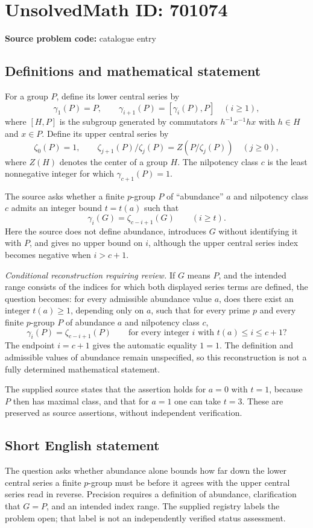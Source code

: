 \documentclass[11pt]{article}
\begin{document}
\section*{UnsolvedMath ID: 701074}
\textbf{Source problem code:} catalogue entry
\subsection{Definitions and mathematical statement}
For a group \(P\), define its lower central series by
\[
\gamma_1(P)=P,\qquad \gamma_{i+1}(P)=[\gamma_i(P),P]\quad(i\geq1),
\]
where \([H,P]\) is the subgroup generated by commutators \(h^{-1}x^{-1}hx\) with \(h\in H\) and \(x\in P\). Define its upper central series by
\[
\zeta_0(P)=1,\qquad
\zeta_{j+1}(P)/\zeta_j(P)=Z(P/\zeta_j(P))\quad(j\geq0),
\]
where \(Z(H)\) denotes the center of a group \(H\). The nilpotency class \(c\) is the least nonnegative integer for which \(\gamma_{c+1}(P)=1\).

The source asks whether a finite \(p\)-group \(P\) of ``abundance'' \(a\) and nilpotency class \(c\) admits an integer bound \(t=t(a)\) such that
\[
\gamma_i(G)=\zeta_{c-i+1}(G)\qquad(i\geq t).
\]
Here the source does not define abundance, introduces \(G\) without identifying it with \(P\), and gives no upper bound on \(i\), although the upper central series index becomes negative when \(i>c+1\).

\emph{Conditional reconstruction requiring review.} If \(G\) means \(P\), and the intended range consists of the indices for which both displayed series terms are defined, the question becomes: for every admissible abundance value \(a\), does there exist an integer \(t(a)\geq1\), depending only on \(a\), such that for every prime \(p\) and every finite \(p\)-group \(P\) of abundance \(a\) and nilpotency class \(c\),
\[
\gamma_i(P)=\zeta_{c-i+1}(P)
\qquad\text{for every integer }i\text{ with }t(a)\leq i\leq c+1?
\]
The endpoint \(i=c+1\) gives the automatic equality \(1=1\). The definition and admissible values of abundance remain unspecified, so this reconstruction is not a fully determined mathematical statement.

The supplied source states that the assertion holds for \(a=0\) with \(t=1\), because \(P\) then has maximal class, and that for \(a=1\) one can take \(t=3\). These are preserved as source assertions, without independent verification.
\subsection{Short English statement}
The question asks whether abundance alone bounds how far down the lower central series a finite \(p\)-group must be before it agrees with the upper central series read in reverse. Precision requires a definition of abundance, clarification that \(G=P\), and an intended index range. The supplied registry labels the problem open; that label is not an independently verified status assessment.
\end{document}
